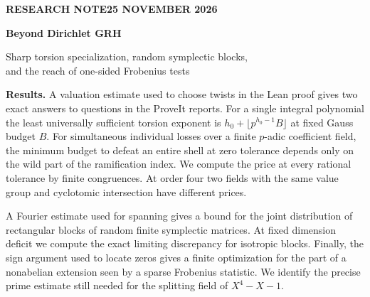 \documentclass[10pt]{article}
\begin{document}
\raggedbottom\thispagestyle{plain}
{\noindent\small\sffamily\bfseries\color{accent}RESEARCH NOTE\hfill 25 NOVEMBER 2026\par}
\vspace{10pt}
{\noindent\fontsize{27}{31}\selectfont\sffamily\bfseries\color{ink}Beyond Dirichlet GRH\par}
\vspace{4pt}
{\noindent\fontsize{15}{19}\selectfont\sffamily\color{ink}Sharp torsion specialization, random symplectic blocks,\\and the reach of one-sided Frobenius tests\par}
\vspace{7pt}{\noindent\color{accent}\rule{\linewidth}{.7pt}\par}\vspace{4pt}
\noindent\textbf{Results.} A valuation estimate used to choose twists in the Lean proof gives two exact answers to questions in the ProveIt reports. For a single integral polynomial the least universally sufficient torsion exponent is $h_0+\lfloor p^{h_0-1}B\rfloor$ at fixed Gauss budget $B$. For simultaneous individual losses over a finite $p$-adic coefficient field, the minimum budget to defeat an entire shell at zero tolerance depends only on the wild part of the ramification index. We compute the price at every rational tolerance by finite congruences. At order four two fields with the same value group and cyclotomic intersection have different prices.

A Fourier estimate used for spanning gives a bound for the joint distribution of rectangular blocks of random finite symplectic matrices. At fixed dimension deficit we compute the exact limiting discrepancy for isotropic blocks. Finally, the sign argument used to locate zeros gives a finite optimization for the part of a nonabelian extension seen by a sparse Frobenius statistic. We identify the precise prime estimate still needed for the splitting field of $X^4-X-1$.
\end{document}
